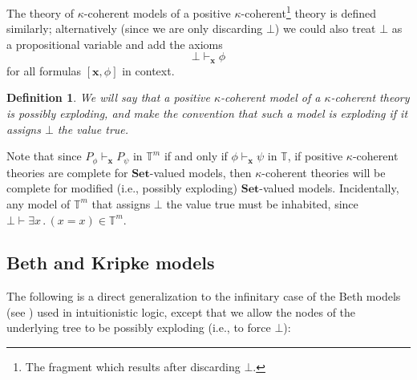 \documentclass[a4paper,11pt]{article}
\theoremstyle{plain}
\theoremstyle{plain}
\newtheorem{defs}[thm]{Definition}
\theoremstyle{remark}
\newcommand{\alg}[1]{\ensuremath{\mathbf{#1}}}
\newcommand{\Sets}{\ensuremath{\mathbf{Set}}}
\newcommand{\fins}[1]{\exists {#1}\mathpunct .}
\newcommand{\theory}{\ensuremath{\mathbb{T}}}
\begin{document}
The theory of $\kappa$-coherent models of a positive $\kappa$-coherent\footnote{The fragment which results after discarding $\bot$.} theory is defined similarly; alternatively (since we are only discarding $\bot$) we could also treat $\bot$ as a propositional variable and add the axioms 
\[\bot\vdash_{\alg{x}}\phi\]
for all formulas $[\mathbf{x}, \phi]$ in context. 

\begin{defs}
 We will say that a positive $\kappa$-coherent model of a $\kappa$-coherent theory is \emph{possibly exploding}, and make the convention that such a model is \emph{exploding} if it assigns $\bot$ the value true.
\end{defs}

Note that since $P_{\phi}\vdash_{\alg{x}}P_{\psi}$ in $\theory^m$ if and only if $\phi\vdash_{\alg{x}}{\psi}$ in \theory, if positive $\kappa$-coherent theories are complete for $\Sets$-valued models, then $\kappa$-coherent theories will be complete for modified (i.e., possibly exploding) $\Sets$-valued models. Incidentally, any model of $\theory^m$ that assigns $\bot$ the value true must be inhabited, since $\bot\vdash \fins{x} (x=x)\in \theory^m$.



\subsection{Beth and Kripke models}

The following is a direct generalization to the infinitary case of the Beth models (see \cite{beth}) used in intuitionistic logic, except that we allow the nodes of the underlying tree to be possibly exploding (i.e., to force $\bot$):
\end{document}
